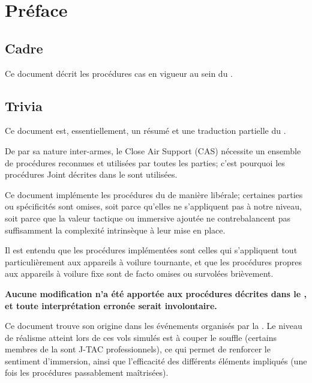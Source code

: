 \thispagestyle{default}



\section*{Préface}

\subsection*{Cadre}

Ce document décrit les procédures \acrfull{cas} en vigueur au sein du \rgt{}.

\subsection*{Trivia}

Ce document est, essentiellement, un résumé et une traduction partielle du \jp{}.

De par sa nature inter-armes, le Close Air Support (CAS) nécessite un ensemble de procédures reconnues et utilisées par toutes les parties; c'est pourquoi les procédures Joint décrites dans le \jp{} sont utilisées.

Ce document implémente les procédures du \jp{} de manière libérale; certaines parties ou spécificités sont omises, soit parce qu'elles ne s'appliquent pas à notre niveau, soit parce que la valeur tactique ou immersive ajoutée ne contrebalancent pas suffisamment la complexité intrinsèque à leur mise en place.

Il est entendu que les procédures implémentées sont celles qui s'appliquent tout particulièrement aux appareils à voilure tournante, et que les procédures propres aux appareils à voilure fixe sont de facto omises ou survolées brièvement.

\textbf{Aucune modification n'a été apportée aux procédures décrites dans le \jp{}, et toute interprétation erronée serait involontaire.}

Ce document trouve son origine dans les événements organisés par la \onethreetwo{}. Le niveau de réalisme atteint lors de ces vols simulés est à couper le souffle (certains membres de la \onethreetwo{} sont J-TAC professionnels), ce qui permet de renforcer le sentiment d'immersion, ainsi que l'efficacité des différents éléments impliqués (une fois les procédures passablement maîtrisées). 